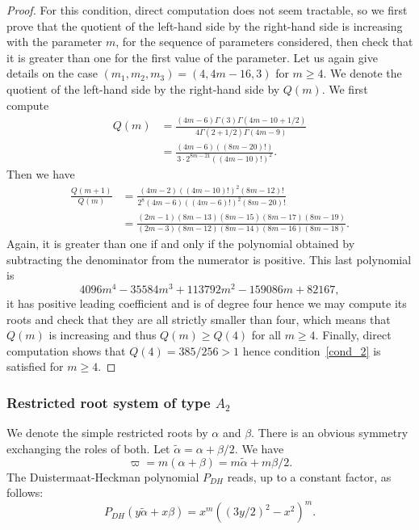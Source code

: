 \documentclass[10pt]{amsart}
\theoremstyle{plain}
\theoremstyle{definition}
\begin{document}
\begin{proof}
For this condition, direct computation does not seem tractable, so we first prove
that the quotient of the left-hand side by the right-hand side is increasing with the parameter $m$,
for the sequence of parameters considered,
then check that it is greater than one for the first value of the parameter.
Let us again give details on the case $(m_1,m_2,m_3)=(4,4m-16,3)$ for $m\geq 4$.
We denote the quotient of the left-hand side by the right-hand side by $Q(m)$.
We first compute
\begin{align*}
Q(m)&= \frac{(4m-6)\Gamma(3)\Gamma(4m-10+1/2)}{4\Gamma(2+1/2)\Gamma(4m-9)} \\
& = \frac{(4m-6)((8m-20)!)}{3\cdot 2^{8m-21}((4m-10)!)^2}.
\end{align*}
Then we have
\begin{align*}
\frac{Q(m+1)}{Q(m)}&=\frac{(4m-2)((4m-10)!)^2(8m-12)!}{2^8(4m-6)((4m-6)!)^2(8m-20)!} \\
&= \frac{(2m-1)(8m-13)(8m-15)(8m-17)(8m-19)}{(2m-3)(8m-12)(8m-14)(8m-16)(8m-18)}.
\end{align*}
Again, it is greater than one if and only if the polynomial obtained by subtracting the
denominator from the numerator is positive. This last polynomial is
\begin{equation*}
4096 m^4 - 35584 m^3 + 113792 m^2 - 159086 m + 82167,
\end{equation*}
it has positive leading coefficient and is of degree four
hence we may compute its roots and check
that they are all strictly smaller than four, which means that $Q(m)$ is
increasing and thus $Q(m)\geq Q(4)$ for all $m\geq 4$. Finally, direct computation
shows that $Q(4)=385/256>1$ hence condition~\eqref{cond_2}
is satisfied for $m\geq 4$.
\end{proof}

\subsubsection{Restricted root system of type $A_2$}

We denote the simple restricted roots by $\alpha$ and $\beta$.
There is an obvious symmetry exchanging the roles of both.
Let $\tilde{\alpha}= \alpha+\beta/2$.
We have
\begin{equation*}
\varpi = m(\alpha+\beta)= m\tilde{\alpha}+m\beta/2.
\end{equation*}
The Duistermaat-Heckman polynomial $P_{DH}$ reads,
up to a constant factor, as follows:
\begin{equation*}
P_{DH}(y\tilde{\alpha}+x\beta)=
x^m((3y/2)^2-x^2)^m.
\end{equation*}
\end{document}

